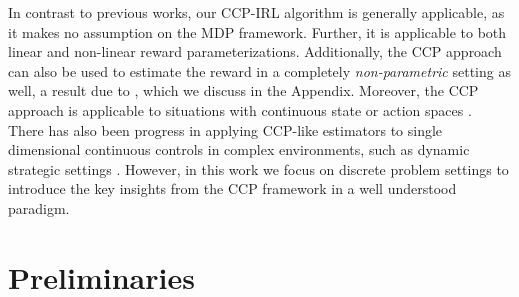 \documentclass{article}
\begin{document}


In contrast to previous works, our CCP-IRL algorithm is generally applicable, as it makes no assumption on the MDP framework. Further, it is applicable to both linear and non-linear reward parameterizations. Additionally, the CCP approach can also be used to estimate the reward in a completely \textit{non-parametric} setting as well, a result due to \cite{magnac}, which we discuss in the Appendix.
Moreover, the CCP approach is applicable to situations with continuous state or action spaces \cite{altuug1998effect}. There has also been progress in applying CCP-like estimators to single dimensional continuous controls in complex environments, such as dynamic strategic settings \cite{pesendorfer}. However, in this work we focus on discrete problem settings to introduce the key insights from the CCP framework in a well understood paradigm.


\section{Preliminaries}
\end{document}
